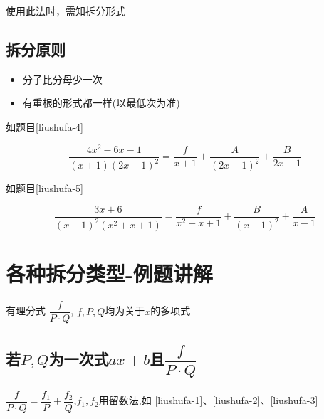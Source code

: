 \vspace{5pt}

 \hspace{0.5em} 使用此法时，需知拆分形式

\subsection{拆分原则}

\begin{itemize}
	\item 分子比分母少一次
	\item 有重根的形式都一样(以最低次为准)
\end{itemize}

如题目\ref{liushufa-4}

\vspace{-20pt}

\[\dfrac{4x^{2}-6x-1}{\left(x+1\right)\left(2x-1\right)^{2}}=\dfrac{f}{x+1}+\dfrac{A}{\left(2x-1\right)^{2}}+\dfrac{B}{2x-1}\]

如题目\ref{liushufa-5}

\vspace{-20pt}

\[\dfrac{3x+6}{\left(x-1\right)^{2}\left(x^{2}+x+1\right)}=\dfrac{f}{x^{2}+x+1}+\dfrac{B}{\left(x-1\right)^{2}}+\dfrac{A}{x-1}\]

\section{各种拆分类型-例题讲解}

有理分式 $\dfrac{f}{P\cdot Q}$\hspace{0.2em}, \hspace{0.5em} $f,P,Q$均为关于$x$的多项式

\subsection{若$P,Q$为一次式$ax+b$且$\dfrac{f}{P\cdot Q}$}

\begin{center}
	$\dfrac{f}{P\cdot Q}=\dfrac{f_{1}}{P}+\dfrac{f_{2}}{Q}$\hspace{0.3em},\hspace{1em}$f_1,f_2$用留数法,如\hspace{0.5em}\hspace{0.5em} \ref{liushufa-1}、\ref{liushufa-2}、\ref{liushufa-3}
\end{center}

